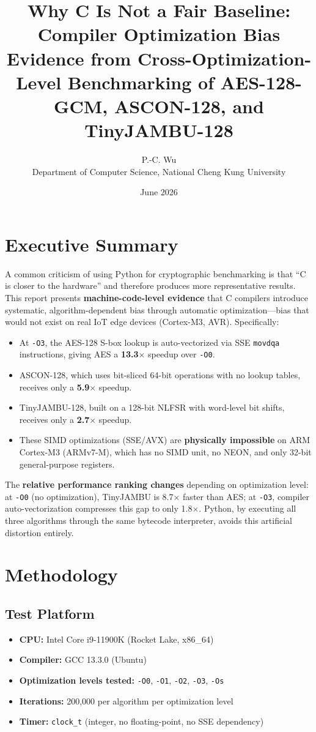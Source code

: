 \documentclass[11pt,a4paper]{article}
\title{\textbf{Why C Is Not a Fair Baseline: Compiler Optimization Bias}\\[4pt]
\large Evidence from Cross-Optimization-Level Benchmarking of AES-128-GCM, ASCON-128, and TinyJAMBU-128}
\author{P.-C. Wu\\Department of Computer Science, National Cheng Kung University}
\date{June 2026}
\begin{document}
\maketitle

\section{Executive Summary}

A common criticism of using Python for cryptographic benchmarking is that ``C is closer to the hardware'' and therefore produces more representative results. This report presents \textbf{machine-code-level evidence} that C compilers introduce systematic, algorithm-dependent bias through automatic optimization---bias that would not exist on real IoT edge devices (Cortex-M3, AVR). Specifically:

\begin{itemize}
    \item At {\tt -O3}, the AES-128 S-box lookup is auto-vectorized via SSE {\tt movdqa} instructions, giving AES a \textbf{13.3$\times$} speedup over {\tt -O0}.
    \item ASCON-128, which uses bit-sliced 64-bit operations with no lookup tables, receives only a \textbf{5.9$\times$} speedup.
    \item TinyJAMBU-128, built on a 128-bit NLFSR with word-level bit shifts, receives only a \textbf{2.7$\times$} speedup.
    \item These SIMD optimizations (SSE/AVX) are \textbf{physically impossible} on ARM Cortex-M3 (ARMv7-M), which has no SIMD unit, no NEON, and only 32-bit general-purpose registers.
\end{itemize}

The \textbf{relative performance ranking changes} depending on optimization level: at {\tt -O0} (no optimization), TinyJAMBU is 8.7$\times$ faster than AES; at {\tt -O3}, compiler auto-vectorization compresses this gap to only 1.8$\times$. Python, by executing all three algorithms through the same bytecode interpreter, avoids this artificial distortion entirely.

\section{Methodology}

\subsection{Test Platform}
\begin{itemize}
    \item \textbf{CPU:} Intel Core i9-11900K (Rocket Lake, x86\_64)
    \item \textbf{Compiler:} GCC 13.3.0 (Ubuntu)
    \item \textbf{Optimization levels tested:} {\tt -O0}, {\tt -O1}, {\tt -O2}, {\tt -O3}, {\tt -Os}
    \item \textbf{Iterations:} 200,000 per algorithm per optimization level
    \item \textbf{Timer:} {\tt clock\_t} (integer, no floating-point, no SSE dependency)
\end{itemize}
\end{document}
